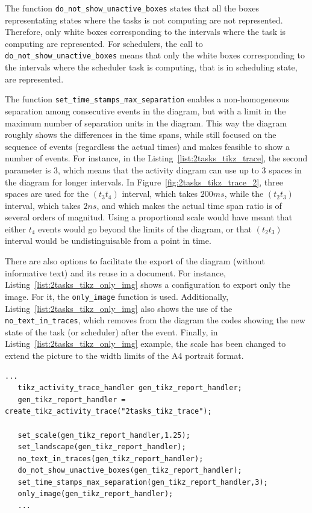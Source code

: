 The function \texttt{do\_not\_show\_unactive\_boxes} states that all the boxes representating states where the tasks is not computing
are not represented.
Therefore, only white boxes corresponding to the intervals where the task is computing are represented.
%
For schedulers, the call to \texttt{do\_not\_show\_unactive\_boxes} means that only the 
white boxes corresponding to the intervals where the scheduler task is computing, that is in scheduling state, are represented.

The function \texttt{set\_time\_stamps\_max\_separation} enables a non-homogeneous separation among
consecutive events in the diagram, but with a limit in the maximum number of separation units in the diagram.
This way the diagram roughly shows the differences in the time spans, while still focused on the sequence of events 
(regardless the actual times) and makes feasible to show a number of events.
For instance, in the Listing~\ref{list:2tasks_tikz_trace}, the second parameter is 3, which means that the activity diagram
can use up to 3 spaces in the diagram for longer intervals.
In Figure~\ref{fig:2tasks_tikz_trace_2}, three spaces are used for the $(t_3t_4)$ interval, which takes $200ms$,
while the $(t_2t_3)$ interval, which takes $2ns$, and which makes the actual time span ratio is of several orders of magnitud.
%
Using a proportional scale would have meant that either $t_4$ events would go beyond the limits of the diagram,
or that $(t_2t_3)$ interval would be undistinguisable from a point in time.

There are also options to facilitate the export of the diagram (without informative text) and its reuse in a document.
For instance,  Listing~\ref{list:2tasks_tikz_only_img} shows a configuration to export only the image.
For it, the \texttt{only\_image} function is used.
Additionally,  Listing~\ref{list:2tasks_tikz_only_img} also shows the use of the \texttt{no\_text\_in\_traces},
which removes from the diagram the codes showing the new state of the task (or scheduler) after the event.
%
Finally, in Listing~\ref{list:2tasks_tikz_only_img} example, the scale has been changed to extend
the picture to the width limits of the A4 portrait format.
%

\begin{table}[htbp]
\begin{lstlisting}[style=KistaCodeStyle,caption={API for controling tracing tasks and scheduler activity.},label=list:2tasks_tikz_only_img]
   ...
   tikz_activity_trace_handler gen_tikz_report_handler;
   gen_tikz_report_handler = create_tikz_activity_trace("2tasks_tikz_trace");
   
   set_scale(gen_tikz_report_handler,1.25);
   set_landscape(gen_tikz_report_handler);
   no_text_in_traces(gen_tikz_report_handler);
   do_not_show_unactive_boxes(gen_tikz_report_handler);
   set_time_stamps_max_separation(gen_tikz_report_handler,3);
   only_image(gen_tikz_report_handler);
   ...
\end{lstlisting}
\end{table}

